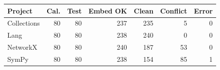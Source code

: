 \begin{tabular}{lrrrrrr}
\toprule
Project & Cal. & Test & Embed OK & Clean & Conflict & Error \\
\midrule
Collections & 80 & 80 & 237 & 235 & 5 & 0 \\
Lang & 80 & 80 & 238 & 240 & 0 & 0 \\
NetworkX & 80 & 80 & 240 & 187 & 53 & 0 \\
SymPy & 80 & 80 & 238 & 154 & 85 & 1 \\
\bottomrule
\end{tabular}
